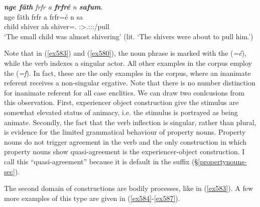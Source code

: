 \begin{exe}
	\ex \emph{\textbf{nge fäth} frfr a \textbf{frfré} n \textbf{safum}.}\\
	\gll nge fäth frfr a frfr=é n sa\\
	child \Dim{} shiver ah shiver=\Erg.{\Nsg} {\Imn} \Stsg:\Sbj>\Tsg.\Masc:\Obj:\Rpst:\Pfv/pull\\
	\trans `The small child was almost shivering' (lit. `The shivers were about to pull him.')
	\label{ex583}
\end{exe}

Note that in (\ref{ex583}) and (\ref{ex580}), the noun phrase is marked with the   (\emph{=é}), while the verb indexes a singular actor. All other examples in the corpus employ the   (\emph{=f}). In fact, these are the only examples in the corpus, where an inanimate referent receives a non-singular ergative. Note that there is no number distinction for inanimate referent for all case enclitics. We can draw two conlcusions from this observation. First, experiencer object construction give the stimulus are somewhat elevated status of animacy, i.e. the stimulus is portrayed as being animate. Secondly, the fact that the verb inflection is singular, rather than plural, is evidence for the limited grammatical behaviour of property nouns. Property nouns do not trigger agreement in the verb and the only construction in which property nouns show quasi-agreement is the experiencer-object construction. I call this ``quasi-agreement'' because it is default \Stsg{} in the suffix ({\S}\ref{propertynouns-sec}).

The second domain of  constructions are bodily processes, like in (\ref{ex583}). A few more examples of this type are given in (\ref{ex584}-\ref{ex587}).


